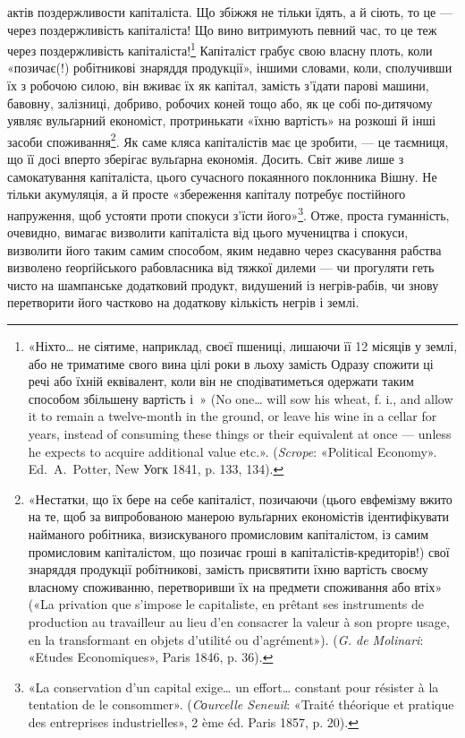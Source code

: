 актів поздержливости капіталіста. Що збіжжя не тільки їдять,
а й сіють, то це — через поздержливість капіталіста! Що вино
витримують певний час, то це теж через поздержливість капіталіста!\footnote{
«Ніхто\dots{} не сіятиме, наприклад, своєї пшениці, лишаючи її
12 місяців у землі, або не триматиме свого вина цілі роки в льоху замість
Одразу спожити ці речі або їхній еквівалент, коли він не сподіватиметься
одержати таким способом збільшену вартість і~» (No one\dots{} will sow
his wheat, f. i., and allow it to remain a twelve-month in the ground,
or leave his wine in a cellar for years, instead of consuming these things
or their equivalent at once — unless he expects to acquire additional value
etc.». (\emph{Scrope}: «Political Economy». Ed.~A.~Potter, New Уогк 1841,
p. 133, 134).
} Капіталіст грабує свою власну плоть, коли «позичає(!)
робітникові знаряддя продукції», іншими словами, коли,
сполучивши їх з робочою силою, він вживає їх як капітал, замість
з’їдати парові машини, бавовну, залізниці, добриво, робочих
коней тощо або, як це собі по-дитячому уявляє вульґарний
економіст, протринькати «їхню вартість» на розкоші
й інші засоби споживання\footnote{
«Нестатки, що їх бере на себе капіталіст, позичаючи (цього
евфемізму вжито на те, щоб за випробованою манерою вульґарних економістів
ідентифікувати найманого робітника, визискуваного промисловим
капіталістом, із самим промисловим капіталістом, що позичає гроші
в капіталістів-кредиторів!) свої знаряддя продукції робітникові, замість
присвятити їхню вартість своєму власному споживанню, перетворивши
їх на предмети споживання або втіх» («La privation que s’impose le
capitaliste, en prêtant ses instruments de production au travailleur au lieu
d’en consacrer la valeur à son propre usage, en la transformant en objets
d'utilité ou d’agrément»). (\emph{G. de Molinari}: «Etudes Economiques», Paris
1846, p. 36).
}. Як саме кляса капіталістів має
це зробити, — це таємниця, що її досі вперто зберігає вульґарна
економія. Досить. Світ живе лише з самокатування капіталіста,
цього сучасного покаянного поклонника Вішну. Не тільки
акумуляція, а й просте «збереження капіталу потребує постійного
напруження, щоб устояти проти спокуси з’їсти його»\footnote{
«La conservation d’un capital exige\dots{} un effort\dots{} constant pour
résister à la tentation de le consommer». (\emph{Cоurcelle Seneuil}: «Traité
théorique et pratique des entreprises industrielles», 2 ème éd. Paris 1857, p. 20).
}.
Отже, проста гуманність, очевидно, вимагає визволити капіталіста
від цього мучеництва і спокуси, визволити його таким самим
способом, яким недавно через скасування рабства визволено
ґеорґійського рабовласника від тяжкої дилеми — чи прогуляти
геть чисто на шампанське додатковий продукт, видушений із
негрів-рабів, чи знову перетворити його частково на додаткову
кількість негрів і землі.

